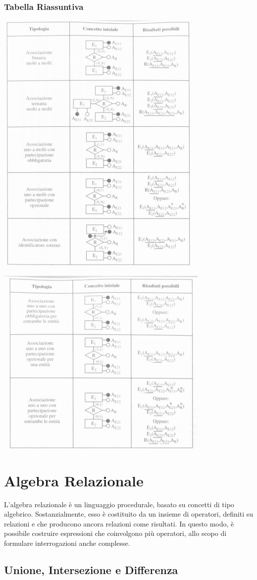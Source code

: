 \documentclass[a4paper,12pt, oneside]{book}
\begin{document}
\subsection{Tabella Riassuntiva}
\begin{center}
\includegraphics[scale=1]{img/tabrel.png}
\end{center}
\begin{center}
\includegraphics[scale=1]{img/tanrel2.png}
\end{center}
\chapter{Algebra Relazionale}
L'algebra relazionale è un linguaggio procedurale, basato
su concetti di tipo algebrico. Sostanzialmente, esso è costituito da un insieme di
operatori, definiti su relazioni e che producono ancora relazioni come risultati.
In questo modo, è possibile costruire espressioni che coinvolgono più operatori,
allo scopo di formulare interrogazioni anche complesse.
\section{Unione, Intersezione  e Differenza}
\end{document}
